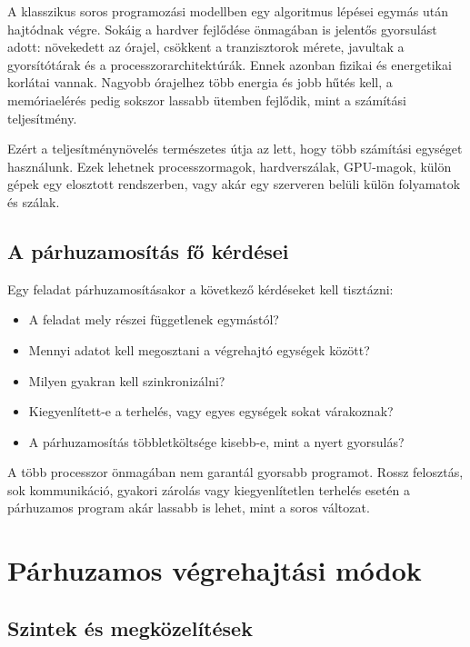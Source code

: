 A klasszikus soros programozási modellben egy algoritmus lépései egymás után hajtódnak végre. Sokáig a hardver fejlődése önmagában is jelentős gyorsulást adott: növekedett az órajel, csökkent a tranzisztorok mérete, javultak a gyorsítótárak és a processzorarchitektúrák. Ennek azonban fizikai és energetikai korlátai vannak. Nagyobb órajelhez több energia és jobb hűtés kell, a memóriaelérés pedig sokszor lassabb ütemben fejlődik, mint a számítási teljesítmény.

Ezért a teljesítménynövelés természetes útja az lett, hogy több számítási egységet használunk. Ezek lehetnek processzormagok, hardverszálak, GPU-magok, külön gépek egy elosztott rendszerben, vagy akár egy szerveren belüli külön folyamatok és szálak.

\subsection{A párhuzamosítás fő kérdései}

Egy feladat párhuzamosításakor a következő kérdéseket kell tisztázni:

\begin{itemize}
  \item A feladat mely részei függetlenek egymástól?
  \item Mennyi adatot kell megosztani a végrehajtó egységek között?
  \item Milyen gyakran kell szinkronizálni?
  \item Kiegyenlített-e a terhelés, vagy egyes egységek sokat várakoznak?
  \item A párhuzamosítás többletköltsége kisebb-e, mint a nyert gyorsulás?
\end{itemize}

\begin{warningbox}
A több processzor önmagában nem garantál gyorsabb programot. Rossz felosztás, sok kommunikáció, gyakori zárolás vagy kiegyenlítetlen terhelés esetén a párhuzamos program akár lassabb is lehet, mint a soros változat.
\end{warningbox}

\section{Párhuzamos végrehajtási módok}

\subsection{Szintek és megközelítések}

